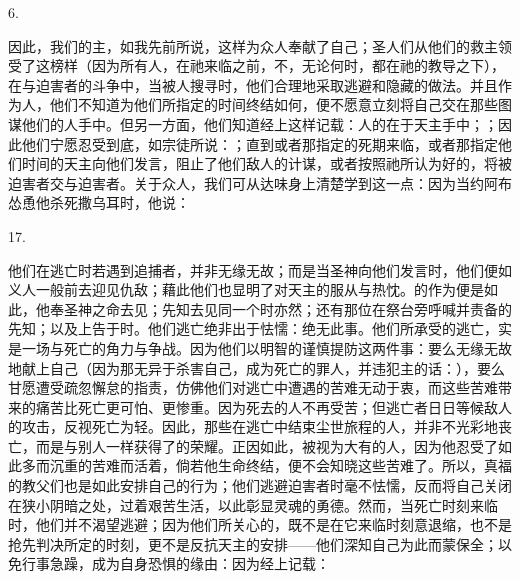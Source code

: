 6. \par

因此，我们的主，如我先前所说，这样为众人奉献了自己；圣人们从他们的救主领受了这榜样（因为所有人，在祂来临之前，不，无论何时，都在祂的教导之下），在与迫害者的斗争中，当被人搜寻时，他们合理地采取逃避和隐藏的做法。并且作为人，他们不知道为他们所指定的时间终结如何，便不愿意立刻将自己交在那些图谋他们的人手中。但另一方面，他们知道经上这样记载：人的在于天主手中；；因此他们宁愿忍受到底，如宗徒所说：；直到或者那指定的死期来临，或者那指定他们时间的天主向他们发言，阻止了他们敌人的计谋，或者按照祂所认为好的，将被迫害者交与迫害者。关于众人，我们可从达味身上清楚学到这一点：因为当约阿布怂恿他杀死撒乌耳时，他说：\par

17. \par

他们在逃亡时若遇到追捕者，并非无缘无故；而是当圣神向他们发言时，他们便如义人一般前去迎见仇敌；藉此他们也显明了对天主的服从与热忱。的作为便是如此，他奉圣神之命去见；先知去见同一个时亦然；还有那位在祭台旁呼喊并责备的先知；以及上告于时。他们逃亡绝非出于怯懦：绝无此事。他们所承受的逃亡，实是一场与死亡的角力与争战。因为他们以明智的谨慎提防这两件事：要么无缘无故地献上自己（因为那无异于杀害自己，成为死亡的罪人，并违犯主的话：），要么甘愿遭受疏忽懈怠的指责，仿佛他们对逃亡中遭遇的苦难无动于衷，而这些苦难带来的痛苦比死亡更可怕、更惨重。因为死去的人不再受苦；但逃亡者日日等候敌人的攻击，反视死亡为轻。因此，那些在逃亡中结束尘世旅程的人，并非不光彩地丧亡，而是与别人一样获得了的荣耀。正因如此，被视为大有的人，因为他忍受了如此多而沉重的苦难而活着，倘若他生命终结，便不会知晓这些苦难了。所以，真福的教父们也是如此安排自己的行为；他们逃避迫害者时毫不怯懦，反而将自己关闭在狭小阴暗之处，过着艰苦生活，以此彰显灵魂的勇德。然而，当死亡时刻来临时，他们并不渴望逃避；因为他们所关心的，既不是在它来临时刻意退缩，也不是抢先判决所定的时刻，更不是反抗天主的安排——他们深知自己为此而蒙保全；以免行事急躁，成为自身恐惧的缘由：因为经上记载：\par

